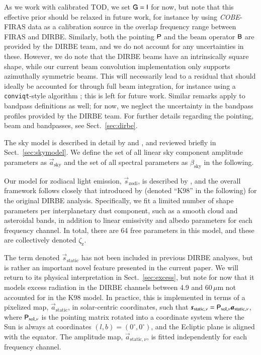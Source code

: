 \documentclass{aa}
\def\COBE{\textit{COBE}}
\newcommand{\B}[0]{\tens{B}}
\newcommand{\G}[0]{\tens{G}}
\newcommand{\s}[0]{\vec{s}}
\renewcommand{\a}[0]{\vec{a}}
\renewcommand{\P}[0]{\tens{P}}
\begin{document}
As we work with calibrated TOD, we set $\G=\tens{I}$ for now, but
note that this effective prior should be relaxed in future work, for
instance by using \COBE-FIRAS data as a calibration source in the
overlap frequency range between FIRAS and DIRBE. Similarly, both the
pointing $\P$ and the beam operator $\B$ are provided by the DIRBE
team, and we do not account for any uncertainties in these. However,
we do note that the DIRBE beams have an intrinsically square shape,
while our current beam convolution implementation only supports
azimuthally symmetric beams. This will necessarily lead to a residual
that should ideally be accounted for through full beam integration,
for instance using a \texttt{conviqt}-style algorithm
\citep{prezeau2010,keihanen2012}; this is left for future
work. Similar remarks apply to bandpass definitions as well; for now,
we neglect the uncertainty in the bandpass profiles provided by the
DIRBE team. For further details regarding the pointing, beam and
bandpasses, see Sect.~\ref{sec:dirbe}.

The sky model is described in detail by \citet{CG02_04} and \citet{CG02_05}, and
reviewed briefly in Sect.~\ref{sec:skymodel}. We define the set of all
linear sky component amplitude parameters as $\a_{\mathrm{sky}}$ and
the set of all spectral parameters as $\beta_{\mathrm{sky}}$ in the
following.

Our model for zodiacal light emission, $\s_{\mathrm{zodi}}$, is
described by \citet{CG02_02}, and the overall framework follows
closely that introduced by \citet{kelsall1998} (denoted ``K98'' in the
following) for the original DIRBE analysis. Specifically, we fit a
limited number of shape parameters per interplanetary dust component,
such as a smooth cloud and asteroidal bands, in addition to linear
emissivity and albedo parameters for each frequency channel. In total,
there are 64 free parameters in this model, and these are collectively
denoted $\zeta_{\mathrm{z}}$.

The term denoted $\s_{\mathrm{static}}$ has not been included in
previous DIRBE analyses, but is rather an important novel feature
presented in the current paper. We will return to its physical
interpretation in Sect.~\ref{sec:excess}, but note for now that it
models excess radiation in the DIRBE channels between 4.9 and
60$\,\mu$m not accounted for in the K98 model. In practice, this is
implemented in terms of a pixelized map, $\a_{\mathrm{static}}$, in
solar-centric coordinates, such that $\s_{\mathrm{static},\nu} =
\P_{\mathrm{sol},\nu}\a_{\mathrm{static},\nu}$, where
$\P_{\mathrm{sol},\nu}$ is the pointing matrix rotated into a
coordinate system where the Sun is always at coordinates
$(l,b)=(0^{\circ},0^{\circ})$, and the Ecliptic plane is aligned with
the equator. The amplitude map, $\a_{\mathrm{static},\nu}$, is fitted
independently for each frequency channel.
\end{document}
